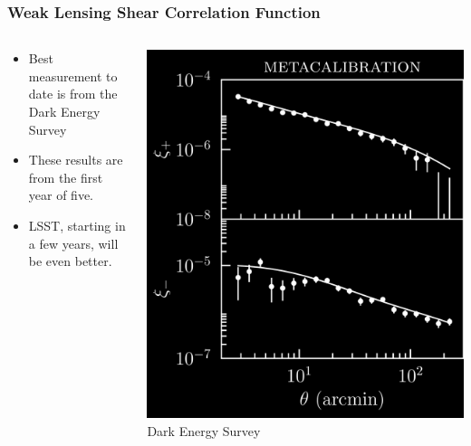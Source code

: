 \documentclass{beamer}
\begin{document}
\frame
{

    \frametitle{Weak Lensing Shear Correlation Function}


    \begin{columns}
        \begin{column}{0.5\textwidth}
            \begin{itemize}

                \item Best measurement to date is from the Dark Energy Survey

                \item These results are from the first year of
                    five.

                \item LSST, starting in a few years, will be even better.

            \end{itemize}

        \end{column}
        \begin{column}{0.5\textwidth}
            \begin{center}
                \includegraphics[width=\textwidth]{xi_notomo_neg.png}
                \newline
                {\tiny Dark Energy Survey}
            \end{center}
        \end{column}

    \end{columns}


}
\end{document}
